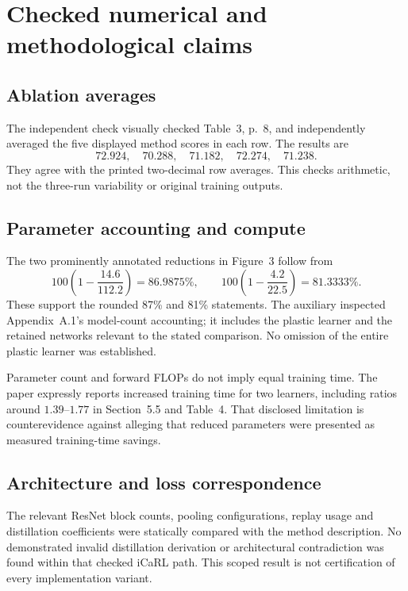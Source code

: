 \documentclass[10pt]{article}
\begin{document}
\section*{Checked numerical and methodological claims}
\subsection*{Ablation averages}
The independent check visually checked Table 3, p. 8, and independently averaged the five displayed method scores in each row. The results are \[72.924,\quad70.288,\quad71.182,\quad72.274,\quad71.238.\] They agree with the printed two-decimal row averages. This checks arithmetic, not the three-run variability or original training outputs.\par
\subsection*{Parameter accounting and compute}
The two prominently annotated reductions in Figure 3 follow from \[100\left(1-\frac{14.6}{112.2}\right)=86.9875\%,\qquad
 100\left(1-\frac{4.2}{22.5}\right)=81.3333\%.\] These support the rounded 87\% and 81\% statements. The auxiliary inspected Appendix A.1’s model-count accounting; it includes the plastic learner and the retained networks relevant to the stated comparison. No omission of the entire plastic learner was established.\par
Parameter count and forward FLOPs do not imply equal training time. The paper expressly reports increased training time for two learners, including ratios around \(1.39\)–\(1.77\) in Section 5.5 and Table 4. That disclosed limitation is counterevidence against alleging that reduced parameters were presented as measured training-time savings.\par
\subsection*{Architecture and loss correspondence}
The relevant ResNet block counts, pooling configurations, replay usage and distillation coefficients were statically compared with the method description. No demonstrated invalid distillation derivation or architectural contradiction was found within that checked iCaRL path. This scoped result is not certification of every implementation variant.\par
\end{document}

